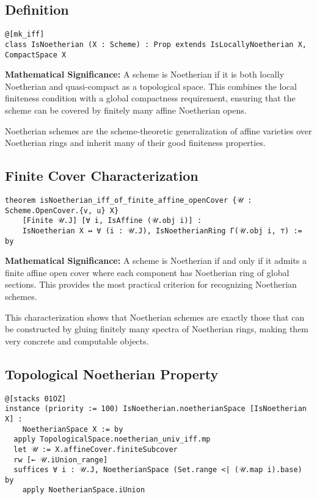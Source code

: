 \documentclass{article}
\theoremstyle{definition}
\begin{document}
\subsection{Definition}

\begin{lstlisting}
@[mk_iff]
class IsNoetherian (X : Scheme) : Prop extends IsLocallyNoetherian X, CompactSpace X
\end{lstlisting}

\textbf{Mathematical Significance:} A scheme is Noetherian if it is both locally Noetherian and quasi-compact as a topological space. This combines the local finiteness condition with a global compactness requirement, ensuring that the scheme can be covered by finitely many affine Noetherian opens.

Noetherian schemes are the scheme-theoretic generalization of affine varieties over Noetherian rings and inherit many of their good finiteness properties.

\subsection{Finite Cover Characterization}

\begin{lstlisting}
theorem isNoetherian_iff_of_finite_affine_openCover {𝒰 : Scheme.OpenCover.{v, u} X}
    [Finite 𝒰.J] [∀ i, IsAffine (𝒰.obj i)] :
    IsNoetherian X ↔ ∀ (i : 𝒰.J), IsNoetherianRing Γ(𝒰.obj i, ⊤) := by
\end{lstlisting}

\textbf{Mathematical Significance:} A scheme is Noetherian if and only if it admits a finite affine open cover where each component has Noetherian ring of global sections. This provides the most practical criterion for recognizing Noetherian schemes.

This characterization shows that Noetherian schemes are exactly those that can be constructed by gluing finitely many spectra of Noetherian rings, making them very concrete and computable objects.

\subsection{Topological Noetherian Property}

\begin{lstlisting}
@[stacks 01OZ]
instance (priority := 100) IsNoetherian.noetherianSpace [IsNoetherian X] :
    NoetherianSpace X := by
  apply TopologicalSpace.noetherian_univ_iff.mp
  let 𝒰 := X.affineCover.finiteSubcover
  rw [← 𝒰.iUnion_range]
  suffices ∀ i : 𝒰.J, NoetherianSpace (Set.range <| (𝒰.map i).base) by
    apply NoetherianSpace.iUnion
\end{lstlisting}
\end{document}
